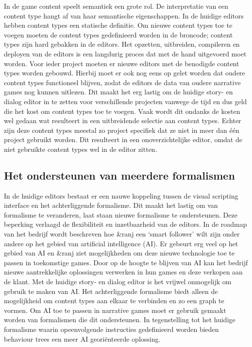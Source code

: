 In de game content speelt semantiek een grote rol. De interpretatie van een content type hangt af van haar semantische eigenschappen. In de huidige editors hebben content types een statische definitie. Om nieuwe content types toe te voegen moeten de content types gedefinieerd worden in de broncode; content types zijn hard gebakken in de editors. Het opzetten, uitbreiden, compileren en deployen van de editors is een langdurig proces dat met de hand uitgevoerd moet worden. Voor ieder project moeten er nieuwe editors met de benodigde content types worden gebouwd. Hierbij moet er ook nog eens op gelet worden dat oudere content types functioneel blijven, zodat de editors de data van oudere narrative games nog kunnen uitlezen. Dit maakt het erg lastig om de huidige story- en dialog editor in te zetten voor verschillende projecten vanwege de tijd en dus geld die het kost om content types toe te voegen. Vaak wordt dit ondanks de kosten wel gedaan wat resulteert in een uitbreidende selectie aan content types. Echter zijn deze content types meestal zo project specifiek dat ze niet in meer dan één project gebruikt worden. Dit resulteert in een onoverzichtelijke editor, omdat de niet gebruikte content types wel in de editor zitten.

\pagebreak
\subsection{Het ondersteunen van meerdere formalismen}
In de huidige editors bestaat er een nauwe koppeling tussen de visual scripting interface en het achterliggende formalisme. Dit maakt het lastig om van formalisme te veranderen, laat staan nieuwe formalisme te ondersteunen. Deze beperking verlaagd de flexibiliteit en inzetbaarheid van de editors. In de roadmap van het bedrijf wordt beschreven hoe \&ranj een ‘smart follower’ wilt zijn onder andere op het gebied van artificial intelligence (AI). Er gebeurt erg veel op het gebied van AI en \&ranj ziet mogelijkheden om deze nieuwe technologie toe te passen in toekomstige games. Door op de hoogte te blijven van AI kan het bedrijf nieuwe aantrekkelijke oplossingen verwerken in hun games en deze verkopen aan de klant. Met de huidige story- en dialog editor is het vrijwel onmogelijk om gebruik te maken van AI. Het achterliggende formalisme biedt alleen de mogelijkheid om content types aan elkaar te verbinden en zo een graph te vormen. Om AI toe te passen in narrative games moet er gebruik gemaakt worden van formalismen die dit ondersteunen. In tegenstelling tot het huidige formalisme waarin opeenvolgende instructies gedefinieerd worden bieden behaviour trees een meer AI georiënteerde oplossing\cite{Pizzi}\cite{Lim2010}.


